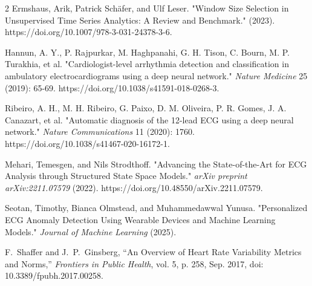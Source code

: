 \documentclass[conference,10pt]{IEEEtran}
\begin{document}
\begin{thebibliography}{2}
 Ermshaus, Arik, Patrick Schäfer, and Ulf Leser. "Window Size Selection in Unsupervised Time Series Analytics: A Review and Benchmark." (2023). https://doi.org/10.1007/978-3-031-24378-3-6.

 Hannun, A. Y., P. Rajpurkar, M. Haghpanahi, G. H. Tison, C. Bourn, M. P. Turakhia, et al. "Cardiologist-level arrhythmia detection and classification in ambulatory electrocardiograms using a deep neural network." \textit{Nature Medicine} 25 (2019): 65-69. https://doi.org/10.1038/s41591-018-0268-3.

 Ribeiro, A. H., M. H. Ribeiro, G. Paixo, D. M. Oliveira, P. R. Gomes, J. A. Canazart, et al. "Automatic diagnosis of the 12-lead ECG using a deep neural network." \textit{Nature Communications} 11 (2020): 1760. https://doi.org/10.1038/s41467-020-16172-1.

 Mehari, Temesgen, and Nils Strodthoff. "Advancing the State-of-the-Art for ECG Analysis through Structured State Space Models." \textit{arXiv preprint arXiv:2211.07579} (2022). https://doi.org/10.48550/arXiv.2211.07579.

 Seotan, Timothy, Bianca Olmstead, and Muhammedawwal Yunusa. "Personalized ECG Anomaly Detection Using Wearable Devices and Machine Learning Models." \textit{Journal of Machine Learning} (2025).

 F.~Shaffer and J.~P.~Ginsberg, ``An Overview of Heart Rate Variability Metrics and Norms,'' \emph{Frontiers in Public Health}, vol. 5, p. 258, Sep. 2017, doi: 10.3389/fpubh.2017.00258.
 
\end{thebibliography}
\end{document}
